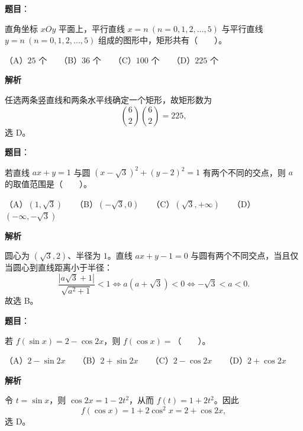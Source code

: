 \begin{answer}

\textbf{题目}：

直角坐标 $xOy$ 平面上，平行直线 $x=n\ (n=0,1,2,\ldots,5)$ 与平行直线 $y=n\ (n=0,1,2,\ldots,5)$ 组成的图形中，矩形共有\mbox{（　　）}。

（A）$25$ 个　　（B）$36$ 个　　（C）$100$ 个　　（D）$225$ 个

\textbf{解析}

任选两条竖直线和两条水平线确定一个矩形，故矩形数为
\nopagebreak[4]
\[
\binom62\binom62=225,
\]
选 D。


\end{answer}
\begin{answer}

\textbf{题目}：

若直线 $ax+y=1$ 与圆 $(x-\sqrt{3})^2+(y-2)^2=1$ 有两个不同的交点，则 $a$ 的取值范围是\mbox{（　　）}。

（A）$(1,\sqrt{3})$　　（B）$(-\sqrt{3},0)$　　（C）$(\sqrt{3},+\infty)$　　（D）$(-\infty,-\sqrt{3})$

\textbf{解析}

圆心为 $(\sqrt3,2)$、半径为 $1$。直线 $ax+y-1=0$ 与圆有两个不同交点，当且仅当圆心到直线距离小于半径：
\nopagebreak[4]
\[
\frac{|a\sqrt3+1|}{\sqrt{a^2+1}}<1
\iff a(a+\sqrt3)<0
\iff -\sqrt3<a<0.
\]
故选 B。


\end{answer}
\begin{answer}

\textbf{题目}：

若 $f(\sin x)=2-\cos 2x$，则 $f(\cos x)=$\mbox{（　　）}。

（A）$2-\sin 2x$　　（B）$2+\sin 2x$　　（C）$2-\cos 2x$　　（D）$2+\cos 2x$

\textbf{解析}

令 $t=\sin x$，则 $\cos2x=1-2t^2$，从而 $f(t)=1+2t^2$。因此
\nopagebreak[4]
\[
f(\cos x)=1+2\cos^2x=2+\cos2x,
\]
选 D。


\end{answer}
